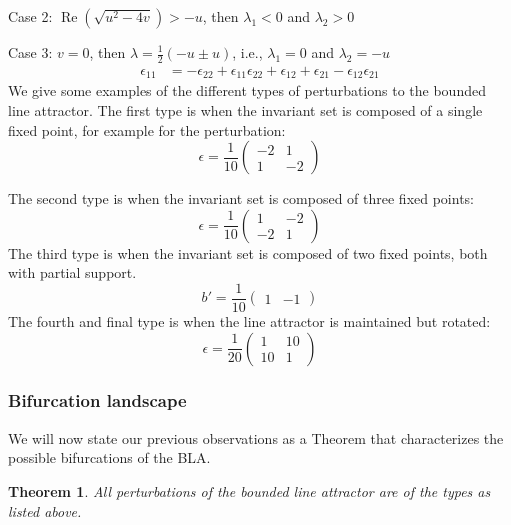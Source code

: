 \documentclass{article} %
\newcounter{ct}
\newtheorem{theorem}{Theorem}
\theoremstyle{definition}
\theoremstyle{remark}
\begin{document}
Case 2:  \(\operatorname{Re}(\sqrt{u^{2} - 4v})>-u\), then
\(\lambda_{1}<0\) and \(\lambda_{2}>0\)


Case 3: \(v = 0\), then
\(\lambda=\tfrac{1}{2}(-u\pm u)\), i.e.,
\(\lambda_{1} = 0\) and  \(\lambda_{2}=-u\)
\begin{align}
\epsilon_{11} &= -\epsilon_{22}+\epsilon_{11}\epsilon_{22} + \epsilon_{12} + \epsilon_{21} - \epsilon_{12}\epsilon_{21}
\end{align}
We give some examples of the different types of perturbations to the bounded line attractor.
The first type is when the invariant set is composed of a single fixed point, for example for the perturbation:
\begin{equation}
\epsilon = \frac{1}{10}
\begin{pmatrix}
-2  &  1 \\
 1   &  -2
\end{pmatrix}
\end{equation}%



The second type is when the invariant set is composed of three fixed points:
\begin{equation}
\epsilon = \frac{1}{10}
\begin{pmatrix}
1  &  -2 \\
 -2  &  1
\end{pmatrix}
\end{equation}
The third type is when the invariant set is composed of two fixed points, both with partial support.
\begin{equation}
b' =  \frac{1}{10}
\begin{pmatrix}
1 & -1
\end{pmatrix}
\end{equation}
The fourth and final type is when the line attractor is maintained but rotated:
\begin{equation}
\epsilon =  \frac{1}{20}
\begin{pmatrix}
1 & 10\\
10 & 1
\end{pmatrix}
\end{equation}
\subsubsection{Bifurcation landscape}\label{sec:supp:bifurcationlandscape}
We will now state our previous observations as a Theorem that characterizes the possible bifurcations of the BLA.
\begin{theorem}
All perturbations of the bounded line attractor are of the types as listed above.
\end{theorem}
\end{document}
